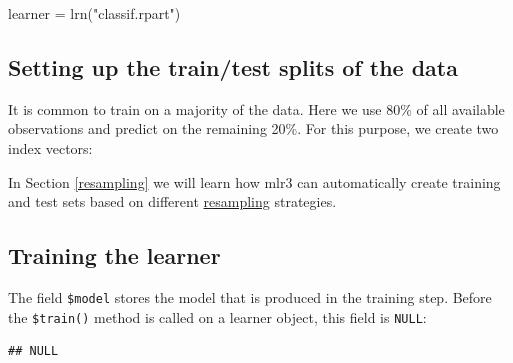 \documentclass[
]{scrbook}
\newenvironment{Shaded}{\begin{snugshade}}{\end{snugshade}}
\newcommand{\FloatTok}[1]{\textcolor[rgb]{0.00,0.00,0.81}{#1}}
\newcommand{\FunctionTok}[1]{\textcolor[rgb]{0.00,0.00,0.00}{#1}}
\newcommand{\NormalTok}[1]{#1}
\newcommand{\OtherTok}[1]{\textcolor[rgb]{0.56,0.35,0.01}{#1}}
\newcommand{\SpecialCharTok}[1]{\textcolor[rgb]{0.00,0.00,0.00}{#1}}
\newcommand{\StringTok}[1]{\textcolor[rgb]{0.31,0.60,0.02}{#1}}
\renewenvironment{Shaded} {\begin{snugshade}\small} {\end{snugshade}}
\begin{document}
\begin{Shaded}
\begin{Highlighting}[]
\NormalTok{learner }\OtherTok{=} \FunctionTok{lrn}\NormalTok{(}\StringTok{"classif.rpart"}\NormalTok{)}
\end{Highlighting}
\end{Shaded}

\hypertarget{split-data}{%
\subsection{Setting up the train/test splits of the data}\label{split-data}}

It is common to train on a majority of the data.
Here we use 80\% of all available observations and predict on the remaining 20\%.
For this purpose, we create two index vectors:

\begin{Shaded}
\end{Shaded}

In Section \ref{resampling} we will learn how mlr3 can automatically create training and test sets based on different \protect\hyperlink{resampling}{resampling} strategies.

\hypertarget{training}{%
\subsection{Training the learner}\label{training}}

The field \texttt{\$model} stores the model that is produced in the training step.
Before the \texttt{\$train()} method is called on a learner object, this field is \texttt{NULL}:

\begin{Shaded}
\end{Shaded}

\begin{verbatim}
## NULL
\end{verbatim}
\end{document}
